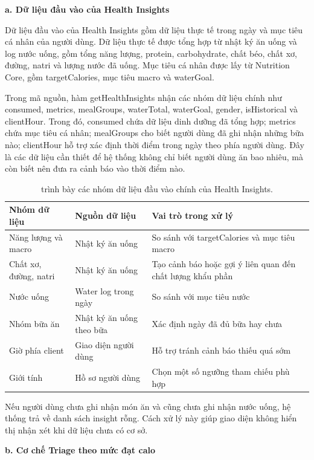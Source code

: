 \documentclass[12pt, a4paper]{report}
\begin{document}
\textbf{a. Dữ liệu đầu vào của Health Insights}

Dữ liệu đầu vào của Health Insights gồm dữ liệu thực tế trong ngày và mục tiêu cá nhân của người dùng. Dữ liệu thực tế được tổng hợp từ nhật ký ăn uống và log nước uống, gồm tổng năng lượng, protein, carbohydrate, chất béo, chất xơ, đường, natri và lượng nước đã uống. Mục tiêu cá nhân được lấy từ Nutrition Core, gồm targetCalories, mục tiêu macro và waterGoal.

Trong mã nguồn, hàm getHealthInsights nhận các nhóm dữ liệu chính như consumed, metrics, mealGroups, waterTotal, waterGoal, gender, isHistorical và clientHour. Trong đó, consumed chứa dữ liệu dinh dưỡng đã tổng hợp; metrics chứa mục tiêu cá nhân; mealGroups cho biết người dùng đã ghi nhận những bữa nào; clientHour hỗ trợ xác định thời điểm trong ngày theo phía người dùng. Đây là các dữ liệu cần thiết để hệ thống không chỉ biết người dùng ăn bao nhiêu, mà còn biết nên đưa ra cảnh báo vào thời điểm nào.

\begin{table}[htbp]
\centering
\caption{trình bày các nhóm dữ liệu đầu vào chính của Health Insights.}
\begin{tabular}{|p{4cm}|p{4cm}|p{7cm}|}
\hline
\textbf{Nhóm dữ liệu} & \textbf{Nguồn dữ liệu} & \textbf{Vai trò trong xử lý} \\
\hline
Năng lượng và macro & Nhật ký ăn uống & So sánh với targetCalories và mục tiêu macro \\
\hline
Chất xơ, đường, natri & Nhật ký ăn uống & Tạo cảnh báo hoặc gợi ý liên quan đến chất lượng khẩu phần \\
\hline
Nước uống & Water log trong ngày & So sánh với mục tiêu nước \\
\hline
Nhóm bữa ăn & Nhật ký ăn uống theo bữa & Xác định ngày đã đủ bữa hay chưa \\
\hline
Giờ phía client & Giao diện người dùng & Hỗ trợ tránh cảnh báo thiếu quá sớm \\
\hline
Giới tính & Hồ sơ người dùng & Chọn một số ngưỡng tham chiếu phù hợp \\
\hline
\hline
\hline
\end{tabular}
\end{table}

Nếu người dùng chưa ghi nhận món ăn và cũng chưa ghi nhận nước uống, hệ thống trả về danh sách insight rỗng. Cách xử lý này giúp giao diện không hiển thị nhận xét khi dữ liệu chưa có cơ sở.

\textbf{b. Cơ chế Triage theo mức đạt calo}
\end{document}
